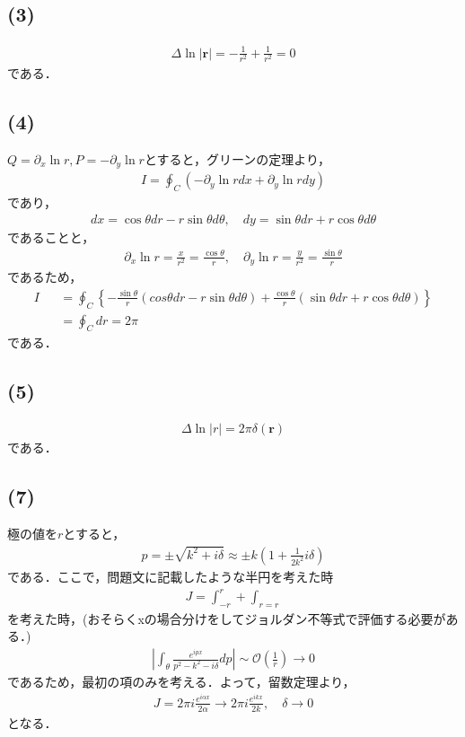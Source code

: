 \documentclass[12pt,dvipdfmx]{jsarticle}
\begin{document}
\subsection*{\large{(3)}}
\begin{eqnarray}
  \Delta\ln|\bm{r}| = -\frac{1}{r^2} + \frac{1}{r^2} = 0
\end{eqnarray}
である．
\subsection*{\large{(4)}}
$Q = \partial_x \ln r, P = -\partial_y \ln r$とすると，グリーンの定理より，
\begin{eqnarray}
  I = \oint_C \left( -\partial_y \ln r dx + \partial_y \ln r dy \right)
\end{eqnarray}
であり，
\begin{eqnarray}
  dx = \cos\theta dr  - r\sin\theta d\theta, \quad dy = \sin\theta dr + r\cos\theta d\theta
\end{eqnarray}
であることと，
\begin{eqnarray}
  \partial_x \ln r = \frac{x}{r^2} = \frac{\cos\theta}{r}, \quad \partial_y \ln r = \frac{y}{r^2} = \frac{\sin\theta}{r}
\end{eqnarray}
であるため，
\begin{eqnarray}
  I &&= \oint_C \left\{ -\frac{\sin\theta}{r}\left(cos\theta dr  - r\sin\theta d\theta \right) + \frac{\cos\theta}{r}\left( \sin\theta dr + r\cos\theta d\theta \right)  \right\}\\
  &&= \oint_C dr = 2\pi
\end{eqnarray}
である．
\subsection*{\large{(5)}}
\begin{eqnarray}
  \Delta\ln|r| = 2\pi\delta(\bm{r})
\end{eqnarray}
である．
\subsection*{\large{(7)}}
極の値を$r$とすると，
\begin{eqnarray}
  p = \pm\sqrt{ k^2 + i\delta } \approx \pm k \left( 1 + \frac{1}{2k^2}i\delta \right)
\end{eqnarray}
である．ここで，問題文に記載したような半円を考えた時
\begin{eqnarray}
  J = \int_{-r}^{r} + \int_{r=r}
\end{eqnarray}
を考えた時，(おそらくxの場合分けをしてジョルダン不等式で評価する必要がある．)
\begin{eqnarray}
  \left| \int_{\theta} \frac{e^{ipx}}{p^2-k^2-i\delta} dp \right| \sim\mathcal{O}\left( \frac{1}{r} \right) \to 0
\end{eqnarray}
であるため，最初の項のみを考える．よって，留数定理より，
\begin{eqnarray}
  J = 2\pi i \frac{e^{i\alpha x}}{2\alpha} \to 2\pi i \frac{e^{ikx}}{2k},\quad\delta\to 0
\end{eqnarray}
となる．
\end{document}
